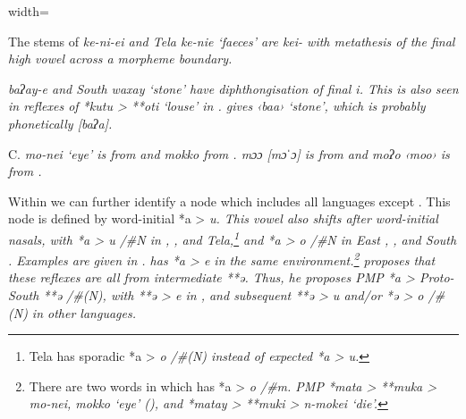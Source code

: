 \begin{table}
\begin{adjustbox}{width=\textwidth}
\begin{threeparttable}
\begin{tablenotes}
			\item[†]	{The stems of   \it{ke-ni-ei}
								and Tela \it{ke-nie} ‘faeces’ are \it{kei-} with metathesis of
								the final high vowel across a morpheme boundary.}
			\item[‡]	{ \it{baʔay-e}
								and South  \it{waxay} ‘stone’ have diphthongisation
								of final \it{i}.
								This is also seen in reflexes of *kutu > **oti ‘louse’ in .
								\citet[158]{vanDijk2021} gives  ‹baa› ‘stone’,
								which is probably phonetically [baʔa].}
			\item[Δ]	{C.  \it{mo-nei} `eye' is from \citet[414]{Taber1993}
								and \it{mokko} from \citet[163]{vanDijk2021}.
								 \it{mɔɔ} [mɔˈɔ] is from \citet[414]{Taber1993}
								and \it{moʔo} ‹mo{\Q}o› is from \citet[163]{vanDijk2021}.}
		\end{tablenotes}
	\end{threeparttable}
\end{adjustbox}
\end{table}

Within  we can further identify a  node which includes all languages except  .
This node is defined by word-initial *a > \it{u}.
This vowel also shifts after word-initial nasals,
with *a > \it{u} /{\#}N{\gap} in ,
, and Tela,\footnote{
Tela has sporadic *a > \it{o} /{\#}(N){\gap}
instead of expected *a > \it{u}.} 
and *a > \it{o} /{\#}N{\gap} in East ,
, and South .
Examples are given in .
  has *a > \it{e} in the same environment.\footnote{
		There are two words in which   has
		*a > \it{o} /{\#}m{\gap}.
		PMP *mata > **muka > \it{mo-nei},
		\it{mokko} ‘eye’ (),
		and *matay > **muki > \it{n-mokei} ‘die’.}
\citet{Zobel2018} proposes that these reflexes are all from intermediate **ə.
Thus, he proposes PMP *a > Proto-South  **ə /{\#}(N){\gap},
with **ə > \it{e} in  ,
and subsequent **ə > \it{u} and/or *ə > \it{o} /{\#}(N){\gap} in other languages.

